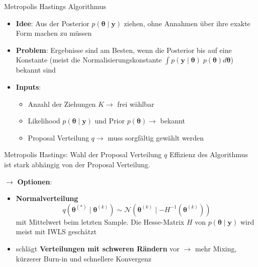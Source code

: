 \documentclass[
  ignorenonframetext,
  aspectratio=169,
]{beamer}
\providecommand{\tightlist}{%
  \setlength{\itemsep}{0pt}\setlength{\parskip}{0pt}}
\newcommand{\by}{\bm{y}}
\newcommand{\Ncal}{\mathcal{N}}
\newcommand{\btheta}{\bm{\theta}}
\begin{document}
\begin{frame}{Metropolis Hastings Algorithmus
\autocite{hastings_monte_1970}}
\protect{}\label{metropolis-hastings-algorithmus-hastings_monte_1970}
\begin{itemize}
\item
  \textbf{Idee}: Aus der Posterior \(p(\btheta\mid \by)\) ziehen, ohne
  Annahmen über ihre exakte Form machen zu müssen
\item
  \textbf{Problem}: Ergebnisse sind am Besten, wenn die Posterior bis
  auf eine Konstante (meist die Normalisierungskonstante
  \(\int p(\by \mid \btheta) \; p(\btheta) d \btheta\)) bekannt sind
\item
  \textbf{Inputs}:

  \begin{itemize}
  \tightlist
  \item
    Anzahl der Ziehungen \(K \to\) frei wählbar
  \item
    Likelihood \(p(\btheta \mid \by)\) und Prior \(p(\btheta) \to\)
    bekannt
  \item
    Proposal Verteilung \(q \to\) muss sorgfältig gewählt werden
  \end{itemize}
\end{itemize}
\end{frame}

\begin{frame}{Metropolis Hastings: Wahl der Proposal Verteilung \(q\)}
\protect{}\label{metropolis-hastings-wahl-der-proposal-verteilung-q}
Effizienz des Algorithmus ist stark abhängig von der Proposal
Verteilung.

\(\to\) \textbf{Optionen}:

\begin{itemize}
\item
  \textbf{Normalverteilung} \[
  q(\btheta^{(*)} \mid \btheta^{(k)}) \sim \Ncal(\btheta^{(k)} \mid -H^{-1}(\btheta^{(k)}))
  \] mit Mittelwert beim letzten Sample. Die Hesse-Matrix \(H\) von
  \(p(\btheta \mid \by)\) wird meist mit IWLS geschätzt
  \autocite{gamerman_markov_1998,lenk_bayesian_2000,scott_data_2011}
\item
  \textcite{scott_data_2011} schlägt \textbf{Verteilungen mit schweren
  Rändern} vor \(\to\) mehr Mixing, kürzerer Burn-in und schnellere
  Konvergenz
\end{itemize}
\end{frame}
\end{document}
